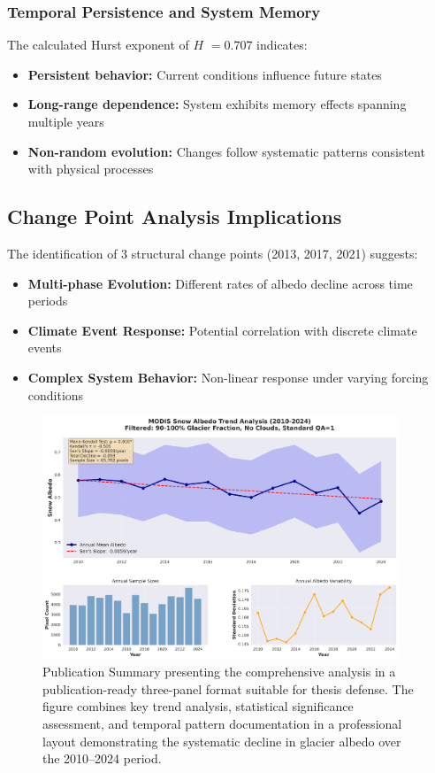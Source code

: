 \documentclass[12pt,a4paper]{article}
\newcommand{\hurst}{$H$}
\begin{document}
\subsubsection{Temporal Persistence and System Memory}

The calculated Hurst exponent of \hurst{} $= 0.707$ indicates:
\begin{itemize}
    \item \textbf{Persistent behavior:} Current conditions influence future states
    \item \textbf{Long-range dependence:} System exhibits memory effects spanning multiple years
    \item \textbf{Non-random evolution:} Changes follow systematic patterns consistent with physical processes
\end{itemize}

\subsection{Change Point Analysis Implications}

The identification of 3 structural change points (2013, 2017, 2021) suggests:
\begin{itemize}
    \item \textbf{Multi-phase Evolution:} Different rates of albedo decline across time periods
    \item \textbf{Climate Event Response:} Potential correlation with discrete climate events
    \item \textbf{Complex System Behavior:} Non-linear response under varying forcing conditions
\end{itemize}

\begin{figure}[H]
\centering
\includegraphics[width=0.95\textwidth]{plots/comprehensive_summary.png}
\caption{Publication Summary presenting the comprehensive analysis in a publication-ready three-panel format suitable for thesis defense. The figure combines key trend analysis, statistical significance assessment, and temporal pattern documentation in a professional layout demonstrating the systematic decline in glacier albedo over the 2010--2024 period.}
\label{fig:publication_summary}
\end{figure}
\end{document}
